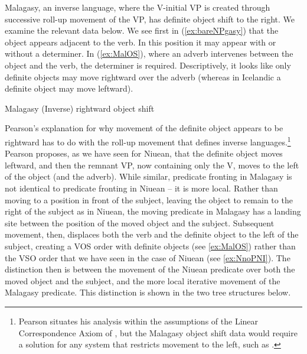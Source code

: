 \documentclass[output=paper,colorlinks,citecolor=brown,
]{langscibook}
\begin{document}
Malagasy, an inverse language, where the V-initial VP is created through successive roll-up movement of the VP, has definite object shift to the right.   We examine the relevant data below.  We see first in (\ref{ex:bareNPgasy}) that the object appears adjacent to the verb. In this position it may  appear with or without a determiner.  In (\ref{ex:MalOS}), where an adverb intervenes between the object and the verb, the determiner is required.  Descriptively, it looks like only definite objects may move rightward over the adverb (whereas in Icelandic a definite object may move leftward). 

\ea Malagasy (Inverse) rightward object shift
	\z
\z

 Pearson's explanation for why movement of the definite object appears to be rightward has to do with the roll-up movement that defines inverse languages.\footnote{Pearson situates his analysis within the assumptions of the Linear Correspondence Axiom of \citet{Kayne:1994}, but the Malagasy object shift data would require a solution for any system that restricts movement to the left, such as \citet{Abels:2012}.}  Pearson proposes, as we have seen for Niuean, that the definite object moves leftward, and then the remnant VP, now containing only the V, moves to the left of the object (and the adverb).  While similar, predicate fronting in Malagasy is not identical to  predicate fronting in Niuean -- it is more local.  Rather than moving to a position in front of the subject, leaving the object to remain to the right of the subject as in Niuean, the moving predicate in Malagasy has a landing site between the position of the moved object and the subject.  Subsequent movement, then, displaces both the verb and the definite object to the left of the subject, creating a VOS order with definite objects  (see \ref{ex:MalOS}) rather than the VSO order that we have seen in the case of Niuean (see \ref{ex:NnoPNI}).  The distinction then is between the movement of the Niuean predicate over both the moved object and the subject, and the more local iterative movement of the Malagasy predicate.  This distinction is shown in the two tree structures below.
\end{document}
